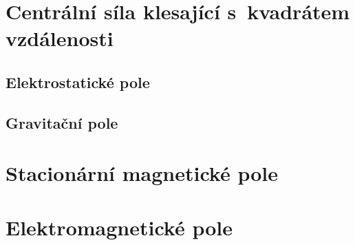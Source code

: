 \section{Centrální síla klesající s~kvadrátem vzdálenosti}

\subsection{Elektrostatické pole}
\subsection{Gravitační pole}

\section{Stacionární magnetické pole}

\section{Elektromagnetické pole}
